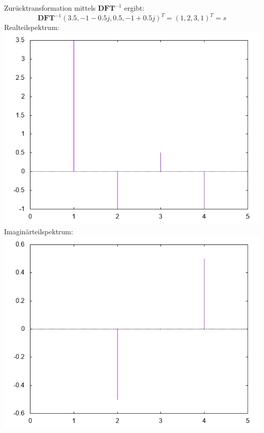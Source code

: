     Zurücktransformation mittels $\textbf{DFT}^{-1}$ ergibt:
    \[
        \textbf{DFT}^{-1} (3.5, -1 - 0.5j, 0.5, -1 + 0.5j)^T = (1, 2, 3, 1)^T = s
    \]
    \newpage
	Realteilspektrum:\\
    \includegraphics[width=\textwidth]{re_spectrum.png}
    \newpage
    Imaginärteilspektrum:\\
    \includegraphics[width=\textwidth]{im_spectrum.png}
\newpage
